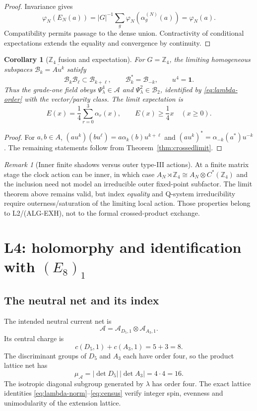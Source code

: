 \documentclass[11pt]{article}
\newtheorem{corollary}[theorem]{Corollary}
\theoremstyle{remark}
\newtheorem{remark}[theorem]{Remark}
\newcommand{\A}{\mathcal A}
\newcommand{\B}{\mathcal B}
\newcommand{\Z}{\mathbb Z}
\newcommand{\id}{\mathbf 1}
\begin{document}
\begin{proof}
Invariance gives
\[
 \varphi_N(E_N(a))
 =|G|^{-1}\sum_g\varphi_N(\alpha_g^{(N)}(a))
 =\varphi_N(a).
\]
Compatibility permits passage to the dense union.  Contractivity of
conditional expectations extends the equality and convergence by
continuity.
\end{proof}

\begin{corollary}[$\Z_4$ fusion and expectation]\label{cor:Z4}
For $G=\Z_4$, the limiting homogeneous subspaces
$\B_k=\overline{Au^k}$ satisfy
\[
 \B_k\B_\ell\subset\B_{k+\ell},\qquad
 \B_k^*=\B_{-k},\qquad u^4=\id.
\tag{6.7}\label{eq:grades}
\]
Thus the grade-one field obeys
$\Psi_\lambda^4\in\A$ and
$\Psi_\lambda^2\in\B_2$, identified by
\eqref{eq:lambda-order} with the vector/parity class.  The limit
expectation is
\[
 E(x)=\frac14\sum_{r=0}^3\alpha_r(x),\qquad E(x)\ge\frac14x
\quad(x\ge0).
\tag{6.8}\label{eq:quarterE}
\]
\end{corollary}

\begin{proof}
For $a,b\in A$,
$(au^k)(bu^\ell)=a\alpha_k(b)u^{k+\ell}$ and
$(au^k)^*=\alpha_{-k}(a^*)u^{-k}$.  The remaining statements follow from
Theorem~\ref{thm:crossedlimit}.
\end{proof}

\begin{remark}[Inner finite shadows versus outer type-III actions]
At a finite matrix stage the clock action can be inner, in which case
$A_N\rtimes\Z_4\cong A_N\otimes C^*(\Z_4)$ and the inclusion need not
model an irreducible outer fixed-point subfactor.  The limit theorem
above remains valid, but index \emph{equality} and Q-system
irreducibility require outerness/saturation of the limiting local action.
Those properties belong to L2/\textup{(ALG-EXH)}, not to the formal
crossed-product exchange.
\end{remark}

\section{L4: holomorphy and identification with \texorpdfstring{$(E_8)_1$}{E8 level 1}}
\label{sec:L4}

\subsection{The neutral net and its index}

The intended neutral current net is
\[
 \A=\A_{D_5,1}\otimes\A_{A_3,1}.
\tag{7.1}\label{eq:basenet}
\]
Its central charge is
\[
 c(D_5,1)+c(A_3,1)=5+3=8.
\tag{7.2}\label{eq:c8}
\]
The discriminant groups of $D_5$ and $A_3$ each have order four, so the
product lattice net has
\[
 \mu_\A=|\det D_5|\,|\det A_3|=4\cdot4=16.
\tag{7.3}\label{eq:mu16}
\]
The isotropic diagonal subgroup generated by $\lambda$ has order four.
The exact lattice identities \eqref{eq:lambda-norm}--\eqref{eq:census}
verify integer spin, evenness and unimodularity of the extension lattice.
\end{document}
